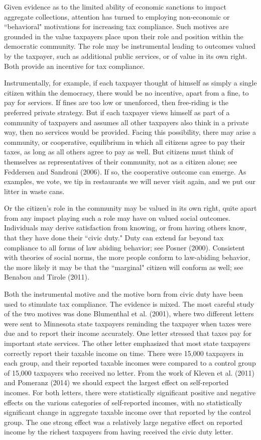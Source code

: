 \documentclass[12pt,titlepage]{article}
\begin{document}
Given evidence as to the limited ability of economic sanctions to
impact aggregate collections, attention has turned to employing
non-economic or ``behavioral" motivations for increasing tax
compliance.  Such motives are grounded in the value taxpayers place
upon their role and position within the democratic community.  The
role may be instrumental leading to outcomes valued by the taxpayer,
such as additional public services, or of value in its own right.
Both provide an incentive for tax compliance.

Instrumentally, for example, if each taxpayer thought of himself as
simply a single citizen within the democracy, there would be no
incentive, apart from a fine, to pay for services.  If fines are too
low or unenforced, then free-riding is the preferred private strategy.
But if each taxpayer views himself as part of a community of taxpayers
and assumes all other taxpayers also think in a private way, then no
services would be provided.  Facing this possibility, there may arise
a community, or cooperative, equilibrium in which all citizens agree
to pay their taxes, as long as all others agree to pay as well.  But
citizens must think of themselves as representatives of their
community, not as a citizen alone; see Feddersen and Sandroni (2006).
If so, the cooperative outcome can emerge.  As examples, we vote, we
tip in restaurants we will never visit again, and we put our litter in
waste cans.

Or the citizen's role in the community may be valued in its own right,
quite apart from any impact playing such a role may have on valued
social outcomes.  Individuals may derive satisfaction from knowing, or
from having others know, that they have done their ``civic duty."
Duty can extend far beyond tax compliance to all forms of law abiding
behavior; see Posner (2000).  Consistent with theories of social
norms, the more people conform to law-abiding behavior, the more
likely it may be that the ``marginal" citizen will conform as well;
see Benabou and Tirole (2011).

Both the instrumental motive and the motive born from civic duty have
been used to stimulate tax compliance.  The evidence is mixed.  
The most careful study of the two motives was done Blumenthal et al. (2001), where two different letters were 
sent to Minnesota state taxpayers reminding the taxpayer when taxes were due and to report their income accurately.  
One letter stressed that taxes pay for important state services. 
The other letter emphasized that most state taxpayers correctly report their taxable income on time.  
There were 15,000 taxpayers in each group, and their reported taxable incomes were compared to a control
group of 15,000 taxpayers who received no letter.  From the work of
Kleven et al. (2011) and Pomeranz (2014) we should expect the largest
effect on self-reported incomes.  For both letters, there were
statistically significant positive and negative effects on the various
categories of self-reported incomes, with no statistically significant
change in aggregate taxable income over that reported by the control
group.  The one strong effect was a relatively large negative effect
on reported income by the richest taxpayers from having received the
civic duty letter.
\end{document}
